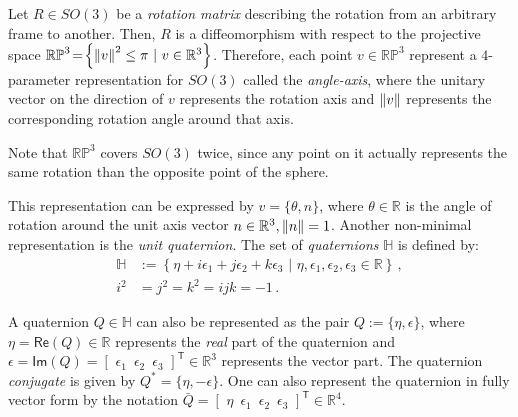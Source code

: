 Let $R \in SO(3)$ be a \textit{rotation matrix} describing the rotation from an arbitrary frame to another.
%
Then, $R$ is a diffeomorphism with respect to the projective space $\mathbb{RP}^{3} \!=\! \left\{ \left\lVert v\right\rVert^2 \leq \pi \,\,|\,\, v \in \mathbb{R}^3 \right\}$.
Therefore, each point $v \in \mathbb{RP}^{3}$ represent a $4$-parameter representation for $SO(3)$ called the \textit{angle-axis}, where the unitary vector on the direction of $v$ represents the rotation axis and $\left\lVert v\right\rVert$ represents the corresponding rotation angle around that axis.
%
\begin{remark}
Note that $\mathbb{RP}^{3}$ covers $SO(3)$ twice, since any point on it actually represents the same rotation than the opposite point of the sphere.
\end{remark}
%
This representation can be expressed by $v = \{\theta,n\}$, where $\theta \in \mathbb{R}$ is the angle of rotation around the unit axis vector $n \in \mathbb{R}^{3}, \left\lVert n\right\rVert = 1$.
%
Another non-minimal representation is the \textit{unit quaternion}. The set of \textit{quaternions} $\mathbb{H}$ is defined by:
%
\begin{align}
\mathbb{H} &:= \left\{ \eta + i \epsilon_{1} + j \epsilon_{2} + k \epsilon_{3} \,\,|\,\, \eta,\epsilon_{1},\epsilon_{2},\epsilon_{3} \in \mathbb{R} \right\} \,, \nonumber \\
i^2 &= j^2 = k^2 = ijk = -1 \,.
\label{eq:def_quaternion}
\end{align}

A quaternion $Q \in \mathbb{H}$ can also be represented as the pair $Q := \{\eta,\epsilon\}$, where 
$\eta = \mathsf{Re}(Q) \in \mathbb{R}$ represents the \textit{real} part of the quaternion and $\epsilon = \mathsf{Im}(Q) = [\,\, \epsilon_{1} \,\,\, \epsilon_{2} \,\,\, \epsilon_{3} \,\,]^\mathsf{T} \in \mathbb{R}^{3}$ represents the vector part.
%
The quaternion \textit{conjugate} is given by $Q^* = \{\eta,-\epsilon\}$.
%
One can also represent the quaternion in fully vector form by the notation 
$\bar{Q} = [\,\, \eta \,\,\, \epsilon_{1} \,\,\, \epsilon_{2} \,\,\, \epsilon_{3} \,\,]^\mathsf{T} \in \mathbb{R}^4$.


